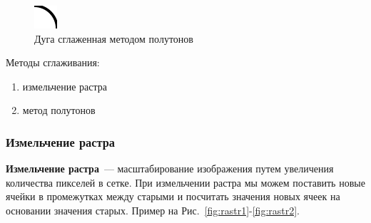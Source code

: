 \begin{figure}[h!]
\begin{minipage}{0.3\textwidth}
        \includegraphics[width=\textwidth]{сглаженная дуга.png} %
        \caption{Дуга сглаженная методом полутонов}
        \label{fig:image2}
    \end{minipage}
\end{figure}

Методы сглаживания:
\begin{enumerate}
    \item измельчение растра
    \item метод полутонов
\end{enumerate}

\subsubsection{Измельчение растра}

\textbf{Измельчение растра}~--- масштабирование изображения путем увеличения количества пикселей в сетке.
При измельчении растра мы можем поставить новые ячейки в промежутках между старыми и посчитать значения новых ячеек на основании значения старых. Пример на Рис.~\ref{fig:rastr1}-\ref{fig:rastr2}.

